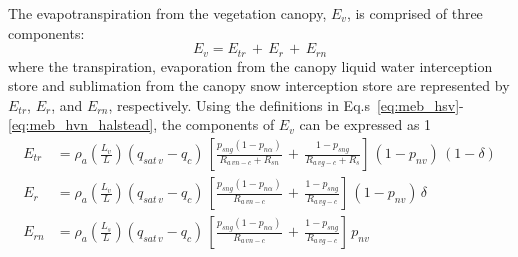 The evapotranspiration from the vegetation canopy, $E_v$, is comprised
of three components:
%
\begin{equation}
\label{eq:meb_ev_comps}
%
E_{v} = E_{tr} \,+\, E_{r} \,+\, E_{rn} 
\end{equation}
%
where the transpiration, evaporation from the canopy liquid water
interception store and sublimation from the canopy snow
interception store 
are represented by $E_{tr}$, $E_{r}$, and $E_{rn}$, respectively.
%
%
Using the definitions in Eq.s~\ref{eq:meb_hsv}-\ref{eq:meb_hvn_halstead}, the
components of $E_v$ can be 
expressed as
%
1%
%
\begin{align}
\label{eq:meb_ev_etr}
%
E_{tr} &= \rho_a \left({\frac{L_v}{L}}\right)
\left( q_{sat\,v} - q_c \right)\,
\left[
{\frac{p_{sng}\left(1-p_{n\alpha}\right)}{R_{a\,vn-c}+R_{sn}}}
\,+\, 
{\frac{1-p_{sng}}{R_{a\,vg-c}+R_{s}}}
\right]\, 
\left(1-p_{nv}\right)\,\left(1-\delta\right)
\\
\label{eq:meb_ev_er}
%
E_{r} &= \rho_a \left({\frac{L_v}{L}}\right)
\left( q_{sat\,v} - q_c \right)\,
\left[
{\frac{p_{sng}\left(1-p_{n\alpha}\right)}{R_{a\,vn-c}}}
\,+\, 
{\frac{1-p_{sng}}{R_{a\,vg-c}}}
\right]\, 
\left(1-p_{nv}\right) \, \delta \,
\\
\label{eq:meb_ev_evn}
%
E_{rn} &= \rho_a \left({\frac{L_s}{L}}\right)
\left( q_{sat\,v} - q_c \right)\,
\left[
{\frac{p_{sng}\left(1-p_{n\alpha}\right)}{R_{a\,vn-c}}}
\,+\, 
{\frac{1-p_{sng}}{R_{a\,vg-c}}}
\right]\, 
p_{nv}
%
\end{align}
